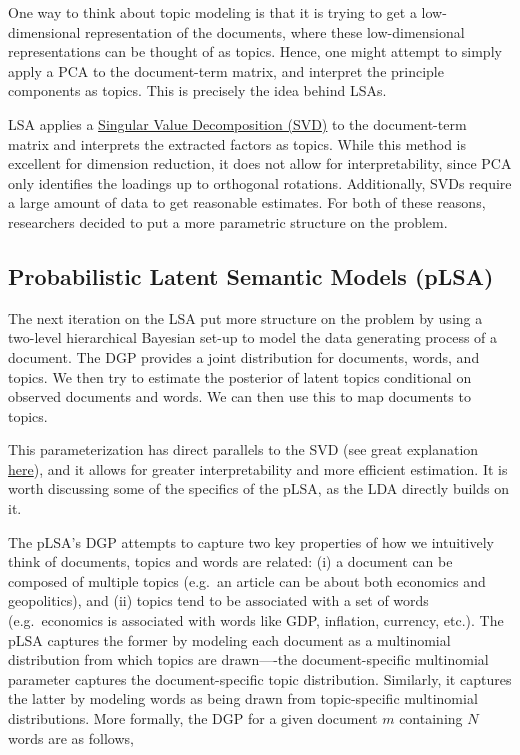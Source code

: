 \documentclass[
]{book}
\begin{document}
One way to think about topic modeling is that it is trying to get a low-dimensional representation of the documents, where these low-dimensional representations can be thought of as topics. Hence, one might attempt to simply apply a PCA to the document-term matrix, and interpret the principle components as topics. This is precisely the idea behind LSAs.

LSA applies a \href{https://en.wikipedia.org/wiki/Singular_value_decomposition}{Singular Value Decomposition (SVD)} to the document-term matrix and interprets the extracted factors as topics. While this method is excellent for dimension reduction, it does not allow for interpretability, since PCA only identifies the loadings up to orthogonal rotations. Additionally, SVDs require a large amount of data to get reasonable estimates. For both of these reasons, researchers decided to put a more parametric structure on the problem.

\hypertarget{probabilistic-latent-semantic-models-plsa}{%
\subsection{Probabilistic Latent Semantic Models (pLSA)}\label{probabilistic-latent-semantic-models-plsa}}

The next iteration on the LSA put more structure on the problem by using a two-level hierarchical Bayesian set-up to model the data generating process of a document. The DGP provides a joint distribution for documents, words, and topics. We then try to estimate the posterior of latent topics conditional on observed documents and words. We can then use this to map documents to topics.

This parameterization has direct parallels to the SVD (see great explanation \href{https://medium.com/nanonets/topic-modeling-with-lsa-psla-lda-and-lda2vec-555ff65b0b05}{here}), and it allows for greater interpretability and more efficient estimation. It is worth discussing some of the specifics of the pLSA, as the LDA directly builds on it.

The pLSA's DGP attempts to capture two key properties of how we intuitively think of documents, topics and words are related: (i) a document can be composed of multiple topics (e.g.~an article can be about both economics and geopolitics), and (ii) topics tend to be associated with a set of words (e.g.~economics is associated with words like GDP, inflation, currency, etc.). The pLSA captures the former by modeling each document as a multinomial distribution from which topics are drawn----the document-specific multinomial parameter captures the document-specific topic distribution. Similarly, it captures the latter by modeling words as being drawn from topic-specific multinomial distributions. More formally, the DGP for a given document \(m\) containing \(N\) words are as follows,
\end{document}
